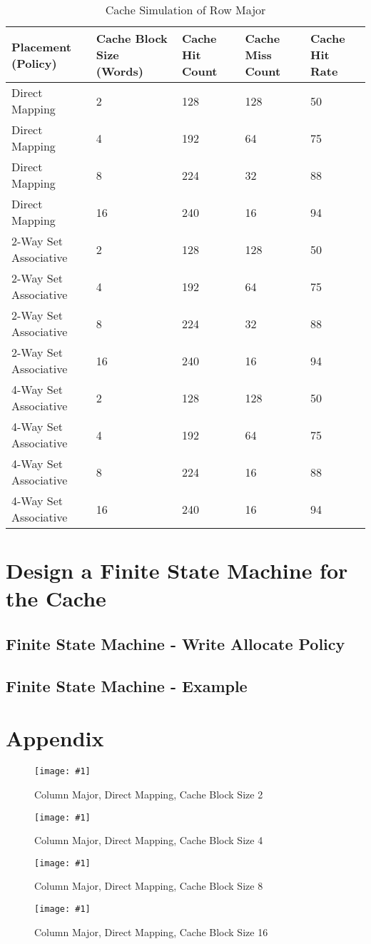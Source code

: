 \documentclass[11pt,a4paper]{article}
\newcommand{\cacheResultFigure}[3]{
\begin{figure}
	\centering
	\texttt{[image: \#1]}
	\caption{#2}
	\label{#3}
\end{figure}
}
\begin{document}
\begin{table}
\caption{Cache Simulation of Row Major}
\label{tab:tableRowMajor}
\begin{tabular}{lllll}
\hline %
Placement (Policy) & Cache Block Size (Words) & Cache Hit Count & Cache Miss Count & Cache Hit Rate \\
\hline %
Direct Mapping & 2 & 128 & 128 & 50  \\
Direct Mapping & 4 & 192 & 64 & 75  \\
Direct Mapping & 8 & 224 & 32 & 88  \\
Direct Mapping & 16 & 240 & 16 & 94  \\
2-Way Set Associative & 2 & 128 & 128 & 50 \\
2-Way Set Associative & 4 & 192 & 64 & 75 \\
2-Way Set Associative & 8 & 224 & 32 & 88 \\
2-Way Set Associative & 16 & 240 & 16 & 94 \\
4-Way Set Associative & 2 & 128 & 128 & 50 \\
4-Way Set Associative & 4 & 192 & 64 & 75 \\
4-Way Set Associative & 8 & 224 & 16 & 88 \\
4-Way Set Associative & 16 & 240 & 16 & 94 \\
\hline %
\end{tabular} 
\end{table}

\newpage
\section{Design a Finite State Machine for the Cache}

\subsection{Finite State Machine - Write Allocate Policy}


\subsection{Finite State Machine - Example}











\newpage
\section{Appendix}
\cacheResultFigure{pictures/task4_columnMajor_directMapping2}{Column Major, Direct Mapping, Cache Block Size 2}{fig:pic}
\cacheResultFigure{pictures/task4_columnMajor_directMapping4}{Column Major, Direct Mapping, Cache Block Size 4}{fig:pic}
\cacheResultFigure{pictures/task4_columnMajor_directMapping8}{Column Major, Direct Mapping, Cache Block Size 8}{fig:pic}
\cacheResultFigure{pictures/task4_columnMajor_directMapping16}{Column Major, Direct Mapping, Cache Block Size 16}{fig:pic}
\end{document}
